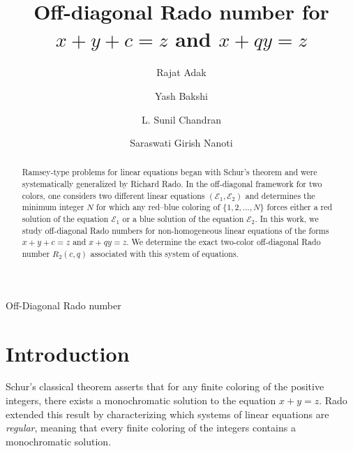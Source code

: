 \documentclass[preprint,12pt]{elsarticle}
\theoremstyle{plain}
\theoremstyle{definition}
\begin{document}
\begin{frontmatter}

\title{Off-diagonal Rado number for $x+y+c=z$ and $x+qy=z$}

\author[1]{Rajat Adak}
\author[1]{Yash Bakshi}
\author[1]{L. Sunil Chandran}
\author[1]{Saraswati Girish Nanoti}
\address[1]{Department of Computer Science and Automation, Indian Institute of Science, Bangalore, India}

\begin{abstract}
Ramsey-type problems for linear equations began with Schur’s theorem and were
systematically generalized by Richard Rado.  In the off-diagonal framework for two colors, one considers two different linear equations $(\mathcal{E}_1,\mathcal{E}_2)$ and determines the minimum integer $N$ for which any red–blue coloring of $\{1,2,\dots,N\}$ forces either a red solution of the  equation $\mathcal{E}_1$  or a blue solution of the equation $\mathcal{E}_2$.  %
In this work, we study off-diagonal Rado numbers for non-homogeneous linear equations of the forms $x+y+c=z$ and $x+qy=z$. We determine the exact two-color off-diagonal Rado number $R_2(c,q)$ associated with this system of equations.
\end{abstract}

\begin{keyword}
Off-Diagonal Rado number
\end{keyword}

\end{frontmatter}
\section{Introduction}

Schur’s classical theorem \cite{1916Schur} asserts that for any finite coloring of the
positive integers, there exists a monochromatic solution to the equation $x+y=z$.  Rado \cite{rado1933studien} extended this result by characterizing which systems of linear equations are \emph{regular}, meaning that every finite coloring of the integers contains a monochromatic solution.
\end{document}
